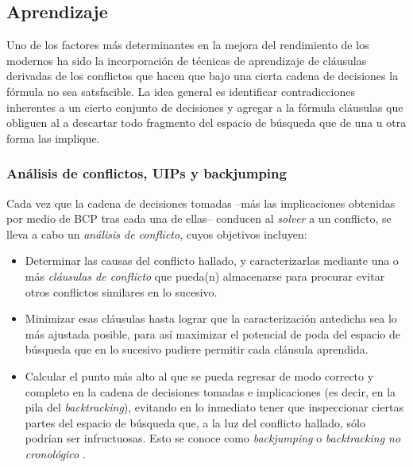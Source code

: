 \subsection{Aprendizaje}
Uno de los factores más determinantes en la mejora del rendimiento de los \ssolver modernos ha sido la incorporación de técnicas de aprendizaje de cláusulas derivadas de los conflictos que hacen que bajo una cierta cadena de decisiones la fórmula no sea satsfacible. La idea general es identificar contradicciones inherentes a un cierto conjunto de decisiones y agregar a la fórmula cláusulas que obliguen al \ssolver a descartar todo fragmento del espacio de búsqueda que de una u otra forma las implique.

\subsubsection{Análisis de conflictos, UIPs y backjumping}

Cada vez que la cadena de decisiones tomadas --más las implicaciones obtenidas por medio de BCP tras cada una de ellas-- conducen al \emph{solver} a un conflicto, se lleva a cabo un \emph{análisis de conflicto}, cuyos objetivos incluyen:

\begin{itemize}

\item Determinar las causas del conflicto hallado, y caracterizarlas mediante una o más \emph{cláusulas de conflicto} que pueda(n) almacenarse para procurar evitar otros conflictos similares en lo sucesivo.

\item Minimizar esas cláusulas hasta lograr que la caracterización antedicha sea lo más ajustada posible, para así maximizar el potencial de poda del espacio de búsqueda que en lo sucesivo pudiere permitir cada cláusula aprendida. %

\item  Calcular el punto más alto al que se pueda regresar de modo correcto y completo en la cadena de decisiones tomadas e implicaciones (es decir, en la pila del \emph{backtracking}), evitando en lo inmediato tener que inspeccionar ciertas partes del espacio de búsqueda que, a la luz del conflicto hallado, sólo podrían ser infructuosas. Esto se conoce como \emph{backjumping} o \emph{backtracking no cronológico} \cite{marques-silva:iccad96} \cite{moskewicz:da01}.

\end{itemize}


